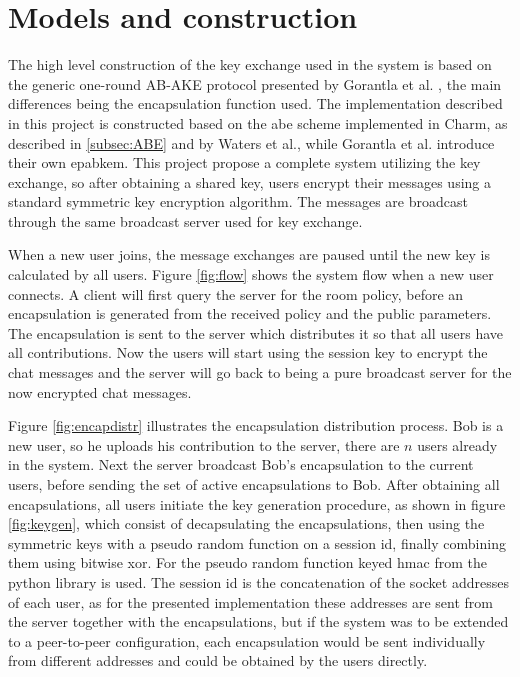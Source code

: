 \section{Models and construction}
The high level construction of the key exchange used in the system is based on the generic one-round AB-AKE protocol presented by Gorantla et al. \cite{gorantla2010attribute}, the main differences being the encapsulation function used. The implementation described in this project is constructed based on the \gls{abe} scheme implemented in Charm, as described in \ref{subsec:ABE} and  by Waters et al.\cite{abe_waters09}, while Gorantla et al.\cite{gorantla2010attribute} introduce their own \gls{epabkem}. This project propose a complete system utilizing the key exchange, so after obtaining a shared key, users encrypt their messages using a standard symmetric key encryption algorithm. The messages are broadcast through the same broadcast server used for key exchange. 
\par When a new user joins, the message exchanges are paused until the new key is calculated by all users. Figure \ref{fig:flow} shows the system flow when a new user connects. A client will first query the server for the room policy, before an encapsulation is generated from the received policy and the public parameters. The encapsulation is sent to the server which distributes it so that all users have all contributions. Now the users will start using the session key to encrypt the chat messages and the server will go back to being a pure broadcast server for the now encrypted chat messages. 
\par Figure \ref{fig:encapdistr} illustrates the encapsulation distribution process. Bob is a new user, so he uploads his contribution to the server, there are $n$ users already in the system. Next the server broadcast Bob's encapsulation to the current users, before sending the set of active encapsulations to Bob. After obtaining all encapsulations, all users initiate the key generation procedure, as shown in figure \ref{fig:keygen}, which consist of decapsulating the encapsulations, then using the symmetric keys with a pseudo random function on a session id, finally combining them using bitwise xor. For the pseudo random function keyed hmac from the python library is used. The session id is the concatenation of the socket addresses of each user, as for the presented implementation these addresses are sent from the server together with the encapsulations, but if the system was to be extended to a peer-to-peer configuration, each encapsulation would be sent individually from different addresses and could be obtained by the users directly. 



